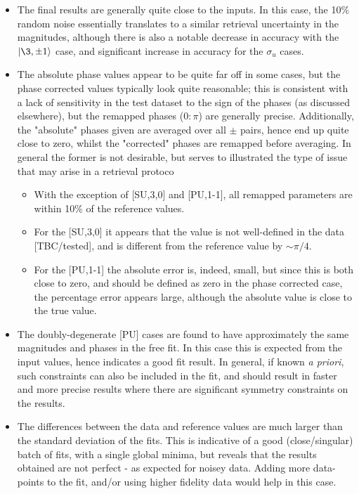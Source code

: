 \begin{itemize}
\item The final results are generally quite close to the inputs. In this case, the 10\% random noise essentially translates to a similar retrieval uncertainty in the magnitudes, although there is also a notable decrease in accuracy with the $|\3,\pm1\rangle$ case, and significant increase in accuracy for the $\sigma_u$ cases.
\item The absolute phase values appear to be quite far off in some cases, but the phase corrected values typically look quite reasonable; this is consistent with a lack of sensitivity in the test dataset to the sign of the phases (as discussed elsewhere), but the remapped phases ($0:\pi$) are generally precise. Additionally, the "absolute" phases given are averaged over all $\pm$ pairs, hence end up quite close to zero, whilst the "corrected" phases are remapped before averaging. In general the former is not desirable, but serves to illustrated the type of issue that may arise in a retrieval protoco
\begin{itemize}
\item With the exception of [SU,3,0] and [PU,1-1], all remapped parameters are within 10\% of the reference values.
\item For the [SU,3,0] it appears that the value is not well-defined in the data [TBC/tested], and is different from the reference value by $\sim\pi/4$.
\item For the [PU,1-1] the absolute error is, indeed, small, but since this is both close to zero, and should be defined as zero in the phase corrected case, the percentage error appears large, although the absolute value is close to the true value.
\end{itemize}
\item The doubly-degenerate [PU] cases are found to have approximately the same magnitudes and phases in the free fit. In this case this is expected from the input values, hence indicates a good fit result. In general, if known \textit{a priori}, such constraints can also be included in the fit, and should result in faster and more precise results where there are significant symmetry constraints on the results.
\item The differences between the data and reference values are much larger than the standard deviation of the fits. This is indicative of a good (close/singular) batch of fits, with a single global minima, but reveals that the results obtained are not perfect - as expected for noisey data. Adding more data-points to the fit, and/or using higher fidelity data would help in this case.

\end{itemize}
